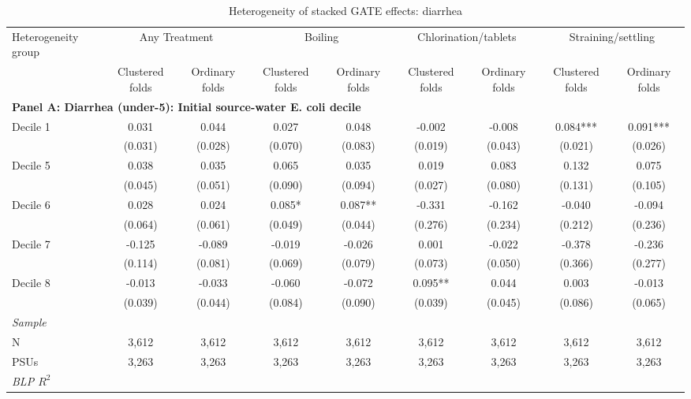 \begin{landscape}
\begin{table}[p]
\centering
\caption{Heterogeneity of stacked GATE effects: diarrhea}
\label{tab:table_heterogeneity_appendix-diarrhea}
\scriptsize\setlength{\tabcolsep}{4pt}
\begin{adjustbox}{max width=\linewidth, center}
\begin{tabular}{lcccccccc}
\toprule
Heterogeneity group & \multicolumn{2}{c}{Any Treatment} & \multicolumn{2}{c}{Boiling} & \multicolumn{2}{c}{Chlorination/tablets} & \multicolumn{2}{c}{Straining/settling} \\
 & Clustered folds & Ordinary folds & Clustered folds & Ordinary folds & Clustered folds & Ordinary folds & Clustered folds & Ordinary folds \\
\midrule
\multicolumn{9}{l}{\textbf{Panel A: Diarrhea (under-5): Initial source-water E. coli decile}} \\
Decile 1 & 0.031 & 0.044 & 0.027 & 0.048 & -0.002 & -0.008 & 0.084*** & 0.091*** \\
 & (0.031) & (0.028) & (0.070) & (0.083) & (0.019) & (0.043) & (0.021) & (0.026) \\
Decile 5 & 0.038 & 0.035 & 0.065 & 0.035 & 0.019 & 0.083 & 0.132 & 0.075 \\
 & (0.045) & (0.051) & (0.090) & (0.094) & (0.027) & (0.080) & (0.131) & (0.105) \\
Decile 6 & 0.028 & 0.024 & 0.085* & 0.087** & -0.331 & -0.162 & -0.040 & -0.094 \\
 & (0.064) & (0.061) & (0.049) & (0.044) & (0.276) & (0.234) & (0.212) & (0.236) \\
Decile 7 & -0.125 & -0.089 & -0.019 & -0.026 & 0.001 & -0.022 & -0.378 & -0.236 \\
 & (0.114) & (0.081) & (0.069) & (0.079) & (0.073) & (0.050) & (0.366) & (0.277) \\
Decile 8 & -0.013 & -0.033 & -0.060 & -0.072 & 0.095** & 0.044 & 0.003 & -0.013 \\
 & (0.039) & (0.044) & (0.084) & (0.090) & (0.039) & (0.045) & (0.086) & (0.065) \\
\multicolumn{9}{l}{\textit{Sample}} \\
\quad N & 3,612 & 3,612 & 3,612 & 3,612 & 3,612 & 3,612 & 3,612 & 3,612 \\
\quad PSUs & 3,263 & 3,263 & 3,263 & 3,263 & 3,263 & 3,263 & 3,263 & 3,263 \\
\multicolumn{9}{l}{\textit{BLP $R^{2}$}} \\

\end{tabular}
\end{adjustbox}
\end{table}
\end{landscape}
